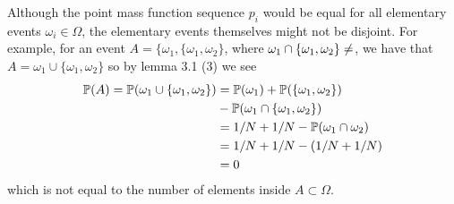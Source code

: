 Although the point mass function sequence $ p_i$ would be equal for all  elementary events 
$\omega_i \in \Omega$, the elementary events themselves might not be disjoint. For example, 
for an event $ A = \{ \omega_1, \{\omega_1, \omega_2 \}  $, where $ \omega_1 \cap   \{\omega_1, \omega_2 \} \neq \empty$, 
we have that $ A = \omega_1 \cup  \{\omega_1, \omega_2 \} $ so by lemma 3.1 (3) we see
\begin{align}
    \P(A) = \P(\omega_1 \cup  \{\omega_1, \omega_2 \} ) &= \P(\omega_1) + \P( \{\omega_1, \omega_2
    \} )\\ 
							&- \P(\omega_1 \cap  \{\omega_1, \omega_2 \} ) \\					    
							&= 1/N + 1/N -  \P(\omega_1 \cap \omega_2)
							\\
						       &= 1/N + 1/N - (1/N + 1/N) \\
						       &= 0 
\end{align}
which is not equal to the number of elements inside $ A \subset \Omega$.

